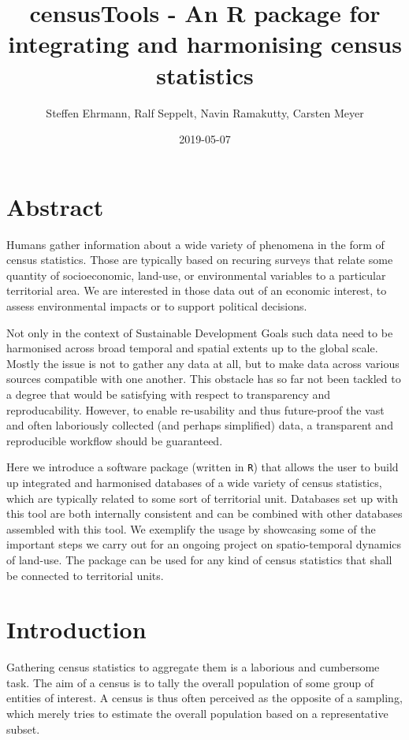\documentclass[12pt,]{article}
\title{censusTools - An R package for integrating and harmonising census statistics}
\author{Steffen Ehrmann, Ralf Seppelt, Navin Ramakutty, Carsten Meyer}
\date{2019-05-07}
\begin{document}
\maketitle

\hypertarget{abstract}{%
\section{Abstract}\label{abstract}}

Humans gather information about a wide variety of phenomena in the form of census statistics.
Those are typically based on recuring surveys that relate some quantity of socioeconomic, land-use, or environmental variables to a particular territorial area.
We are interested in those data out of an economic interest, to assess environmental impacts or to support political decisions.

Not only in the context of Sustainable Development Goals such data need to be harmonised across broad temporal and spatial extents up to the global scale.
Mostly the issue is not to gather any data at all, but to make data across various sources compatible with one another.
This obstacle has so far not been tackled to a degree that would be satisfying with respect to transparency and reproducability.
However, to enable re-usability and thus future-proof the vast and often laboriously collected (and perhaps simplified) data, a transparent and reproducible workflow should be guaranteed.

Here we introduce a software package (written in \texttt{R}) that allows the user to build up integrated and harmonised databases of a wide variety of census statistics, which are typically related to some sort of territorial unit. Databases set up with this tool are both internally consistent and can be combined with other databases assembled with this tool.
We exemplify the usage by showcasing some of the important steps we carry out for an ongoing project on spatio-temporal dynamics of land-use.
The package can be used for any kind of census statistics that shall be connected to territorial units.

\hypertarget{introduction}{%
\section{Introduction}\label{introduction}}

Gathering census statistics to aggregate them is a laborious and cumbersome task.
The aim of a census is to tally the overall population of some group of entities of interest.
A census is thus often perceived as the opposite of a sampling, which merely tries to estimate the overall population based on a representative subset.
\end{document}
